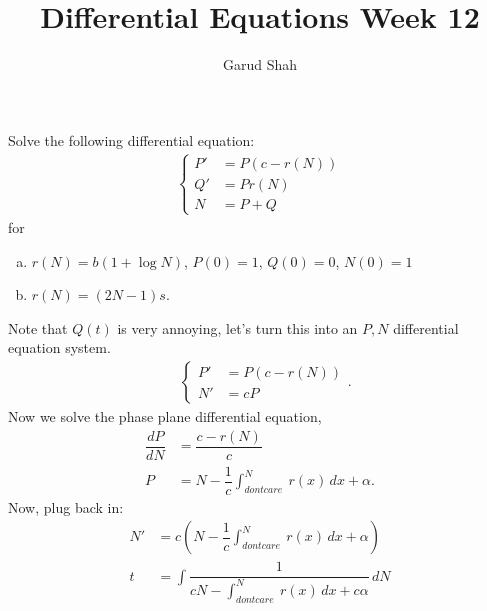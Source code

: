 \documentclass[11pt]{article}
\title{Differential Equations Week \textbf{12}}
\author{Garud Shah}
\begin{document}
    \maketitle \newpage 
    \begin{problem}
        Solve the following differential equation:
        \begin{align}
            \begin{cases}
                P' &= P(c-r(N)) \\
                Q' &= Pr(N) \\
                N &= P+Q
            \end{cases}
        \end{align}
        for 
        \begin{enumerate}[(a)]
            \item $r(N) = b(1+\log N)$, $P(0)=1$, $Q(0)=0$, $N(0)=1$
            \item $r(N) = (2N-1)s$. 
        \end{enumerate}
    \end{problem}
    \begin{solution}
        Note that $Q(t)$ is very annoying, let's turn this into an $P, N$ differential equation system.
        \begin{align}
            &\begin{cases}
                P' &= P(c-r(N)) \\
                N' &= cP 
            \end{cases}.
        \end{align}
        Now we solve the phase plane differential equation,
        \begin{align}
            \dfrac{dP}{dN} &= \dfrac{c-r(N)}{c} \\
            P &= N - \dfrac{1}{c} \int_{dontcare}^N\ r(x) \, dx +\alpha.
        \end{align}
        Now, plug back in:
        \begin{align}
            N' &= c\left(\displaystyle N - \dfrac{1}{c} \int_{dontcare}^N\ r(x) \, dx  +\alpha\right) \\
            t &= \int \dfrac{1}{cN - \int_{dontcare}^N\ r(x) \, dx  +c\alpha} \, dN 
        \end{align}
    \end{solution}\newpage
\end{document}
